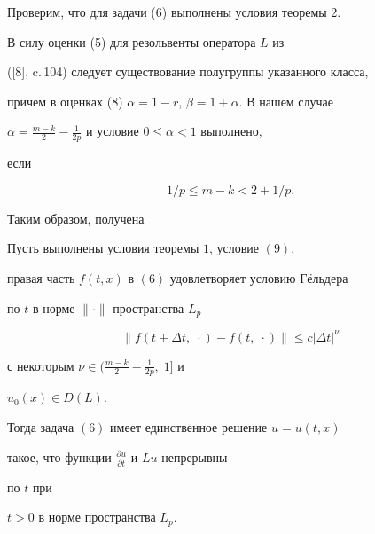 \medskip 


 


Проверим, что для задачи (6) выполнены условия теоремы 2.  


В силу оценки (5) для резольвенты оператора $L$ из 


([8], c.\,104) следует существование полугруппы указанного класса, 


причем в оценках (8)\; $\alpha=1-r$, $\beta=1+\alpha$. В нашем случае 


$\alpha=\frac{m-k}{2}-\frac{1}{2p}$ и условие $0\le\alpha<1$ выполнено, 


если  


\begin{equation} 


1/p\le m-k<2+1/p. 


\end{equation} 


 


Таким образом, получена 


\addtocounter{thm}{1} 


 


\begin{thm} Пусть выполнены условия теоремы $1$, условие $(9)$, 


правая часть $f(t,x)$ в $(6)$ удовлетворяет условию Г\"ельдера  


по $t$ в норме $\|\cdot\|$ пространства $L_p$ 


$$ 


\|f(t+\Delta t,\;\cdot)-f(t,\;\cdot)\|\le 


c|\Delta t|^\nu 


$$ 


с некоторым $\nu\in\big(\frac{m-k}{2}-\frac{1}{2p},\;1\big]$ и 


$u_0(x)\in D(L)$. 


 


Тогда задача $(6)$ имеет единственное решение $u=u(t,x)$ 


такое, что функции $\frac{\partial u}{\partial t}$ и $L u$ непрерывны 


по $t$ при 


$t>0$ в норме пространства $L_p$. 


\end{thm} 


 


